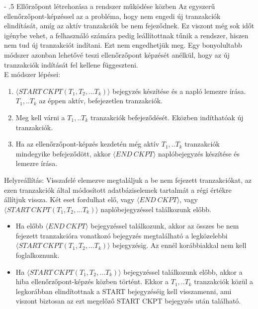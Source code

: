 \documentclass[margin=0px]{article}
\makeatletter
\renewcommand\paragraph{%
	\@startsection{paragraph}{4}{0mm}%
	{-\baselineskip}%
	{.5\baselineskip}%
	{\normalfont\normalsize\bfseries}}
\makeatother
\begin{document}
	\paragraph{Ellőrzőpont létrehozása a rendszer működése közben}
	Az egyszerű ellenőrzőpont-képzéssel az a probléma, hogy nem engedi új tranzakciók elindítását, amíg az aktív tranzakciók be nem
	fejeződnek. Ez viszont még sok időt igénybe vehet, a felhasználó számára pedig leállítottnak tűnik a rendszer, hiszen nem
	tud új tranzakciót indítani. Ezt nem engedhetjük meg. Egy bonyolultabb módszer azonban lehetővé teszi ellenőrzőpont képzését
	anélkül, hogy az új tranzakciók indítását fel kellene függeszteni.\\
	
	\noindent E módszer lépései:
	\begin{enumerate}
		\item	$\langle START \ CKPT(T_{1},T_{2},...T_{k}) \rangle$ bejegyzés készítése és a napló lemezre írása. $T_{1},..T_{k}$
		az éppen aktív, befejezetlen tranzakciók.
		
		\item	Meg kell várni a $T_{1},..T_{k}$ tranzakciók befejeződését. Eközben indíthatóak új tranzakciók.
		
		\item	Ha az ellenőrzőpont-képzés kezdetén még aktív $T_{1},..T_{k}$ tranzakciók mindegyike befejeződött, akkor
		$\langle END \ CKPT \rangle$ naplóbejegyzés készítése és lemezre írása.
	\end{enumerate}
	
	\noindent Helyreállítás: Visszafelé elemezve megtaláljuk a be nem fejezett tranzakciókat, az ezen tranzakciók által
	módosított adatbáziselemek tartalmát a régi értékre állítjuk vissza. Két eset fordulhat elő, vagy $\langle END \ CKPT \rangle$, vagy
	$\langle START \ CKPT(T_{1},T_{2},...T_{k}) \rangle$ naplóbejegyzéssel találkozunk előbb.
	
	\begin{itemize}
		\item	Ha előbb $\langle END \ CKPT \rangle$ bejegyzéssel találkozunk, akkor az összes be nem fejezett tranzakcióra
		vonatkozó bejegyzés megtalálható a legközelebbi $\langle START \ CKPT(T_{1},T_{2},...T_{k}) \rangle$ bejegyzésig. Az ennél
		korábbiakkal nem kell foglalkoznunk.
		
		\item	Ha $\langle START \ CKPT(T_{1},T_{2},...T_{k}) \rangle$ bejegyzéssel találkozunk előbb, akkor a hiba
		ellenőrzőpont-képzés közben történt. Ekkor a $T_{1},..T_{k}$ tranzakciók közül a legkorábban elindítottnak
		a START bejegyzéséig kell visszamenni, ami viszont biztosan az ezt megelőző START CKPT bejegyzés után található.
	\end{itemize}
	
\end{document}
